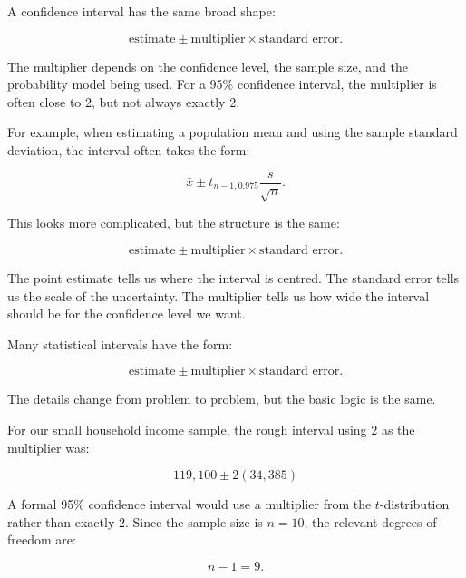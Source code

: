 \documentclass[
  letterpaper,
  DIV=11,
  numbers=noendperiod]{scrreprt}
\begin{document}
A confidence interval has the same broad shape:

\[
\text{estimate} \pm \text{multiplier} \times \text{standard error}.
\]

The multiplier depends on the confidence level, the sample size, and the
probability model being used. For a 95\% confidence interval, the
multiplier is often close to 2, but not always exactly 2.

For example, when estimating a population mean and using the sample
standard deviation, the interval often takes the form:

\[
\bar{x}
\pm
t_{n-1,0.975}
\frac{s}{\sqrt{n}}.
\]

This looks more complicated, but the structure is the same:

\[
\text{estimate}
\pm
\text{multiplier}
\times
\text{standard error}.
\]

The point estimate tells us where the interval is centred. The standard
error tells us the scale of the uncertainty. The multiplier tells us how
wide the interval should be for the confidence level we want.

\begin{tcolorbox}[enhanced jigsaw, arc=.35mm, bottomrule=.15mm, bottomtitle=1mm, breakable, colback=white, colbacktitle=quarto-callout-note-color!10!white, colframe=quarto-callout-note-color-frame, coltitle=black, left=2mm, leftrule=.75mm, opacityback=0, opacitybacktitle=0.6, rightrule=.15mm, title=\textcolor{quarto-callout-note-color}{\faInfo}\hspace{0.5em}{The general shape of many intervals}, titlerule=0mm, toprule=.15mm, toptitle=1mm]

Many statistical intervals have the form:

\[
\text{estimate}
\pm
\text{multiplier}
\times
\text{standard error}.
\]

The details change from problem to problem, but the basic logic is the
same.

\end{tcolorbox}

For our small household income sample, the rough interval using \(2\) as
the multiplier was:

\[
119{,}100 \pm 2(34{,}385)
\]

A formal 95\% confidence interval would use a multiplier from the
\(t\)-distribution rather than exactly 2. Since the sample size is
\(n=10\), the relevant degrees of freedom are:

\[
n - 1 = 9.
\]
\end{document}
